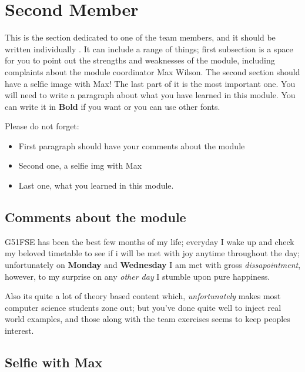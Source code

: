 \section{Second Member}
This is the section dedicated to one of the team members, and it should be written individually . It can include a range of things; first subsection is a space for you to point out the strengths and weaknesses of the module, including complaints about the module coordinator Max Wilson. The second section should have a selfie image with Max! The last part of it is the most important one. You will need to write a paragraph about what you have learned in this module. You can write it in \textbf{Bold} if you want or you can use other fonts. 

Please do not forget:
\begin{itemize}
	\item First paragraph should have your comments about the module
	\item Second one, a selfie img with Max
	\item Last one, what you learned in this module.
\end{itemize}

\subsection{Comments about the module}
G51FSE has been the best few months of my life; everyday I wake up and check my beloved timetable to see if i will be met with joy anytime throughout the day; unfortunately on \textbf{Monday} and \textbf{Wednesday} I am met with gross \textit{dissapointment}, however, to my surprise on any \textit{other day} I stumble upon pure happiness.

Also its quite a lot of theory based content which, \textit{unfortunately} makes most computer science students zone out; but you've done quite well to inject real world examples, and those along with the team exercises seems to keep peoples interest.

\subsection{Selfie with Max}

